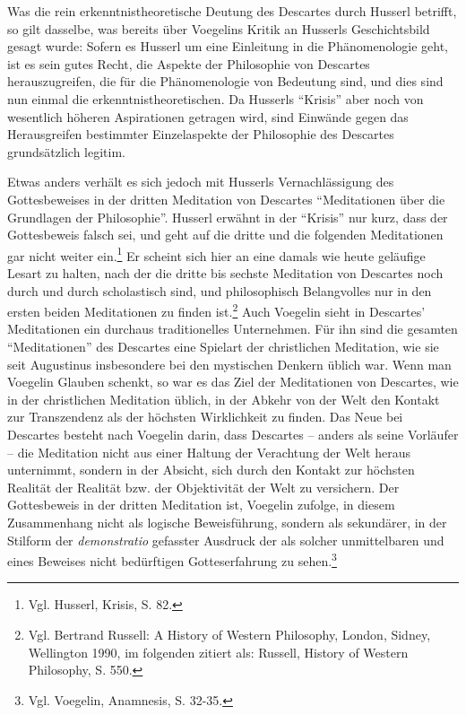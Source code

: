 Was die rein erkenntnistheoretische Deutung des Descartes durch Husserl
betrifft, so gilt dasselbe, was bereits über Voegelins Kritik an Husserls
Geschichtsbild gesagt wurde: Sofern es Husserl um eine Einleitung in die
Phänomenologie geht, ist es sein gutes Recht, die Aspekte der Philosophie von
Descartes herauszugreifen, die für die Phänomenologie von Bedeutung sind, und
dies sind nun einmal die erkenntnistheoretischen. Da Husserls "`Krisis"' aber
noch von wesentlich höheren Aspirationen getragen wird, sind Einwände gegen
das Herausgreifen bestimmter Einzelaspekte der Philosophie des Descartes
grundsätzlich legitim.

Etwas anders verhält es sich jedoch mit Husserls Vernachlässigung des
Gottesbeweises in der dritten Meditation von Descartes "`Meditationen über die
Grundlagen der Philosophie"'. Husserl erwähnt in der "`Krisis"' nur kurz, dass
der Gottesbeweis falsch sei, und geht auf die dritte und die folgenden
Meditationen gar nicht weiter ein.\footnote{Vgl. Husserl, Krisis, S. 82.}  Er
scheint sich hier an eine damals wie heute geläufige Lesart zu halten, nach
der die dritte bis sechste Meditation von Descartes noch durch und durch
scholastisch sind, und philosophisch Belangvolles nur in den ersten beiden
Meditationen zu finden ist.\footnote{Vgl. Bertrand Russell: A History of
  Western Philosophy, London, Sidney, Wellington 1990, im folgenden zitiert
  als: Russell, History of Western Philosophy, S. 550.} Auch Voegelin sieht in
Descartes' Meditationen ein durchaus traditionelles Unternehmen. Für ihn sind
die gesamten "`Meditationen"' des Descartes eine Spielart der christlichen
Meditation, wie sie seit Augustinus insbesondere bei den mystischen Denkern
üblich war. Wenn man Voegelin Glauben schenkt, so war es das Ziel der
Meditationen von Descartes, wie in der christlichen Meditation üblich, in der
Abkehr von der Welt den Kontakt zur Transzendenz als der höchsten Wirklichkeit
zu finden. Das Neue bei Descartes besteht nach Voegelin darin, dass Descartes
-- anders als seine Vorläufer -- die Meditation nicht aus einer Haltung der
Verachtung der Welt heraus unternimmt, sondern in der Absicht, sich durch den
Kontakt zur höchsten Realität der Realität bzw.  der Objektivität der Welt zu
versichern. Der Gottesbeweis in der dritten Meditation ist, Voegelin zufolge,
in diesem Zusammenhang nicht als logische Beweisführung, sondern als
sekundärer, in der Stilform der {\it demonstratio} gefasster Ausdruck der als
solcher unmittelbaren und eines Beweises nicht bedürftigen Gotteserfahrung zu
sehen.\footnote{Vgl. Voegelin, Anamnesis, S. 32-35.}

